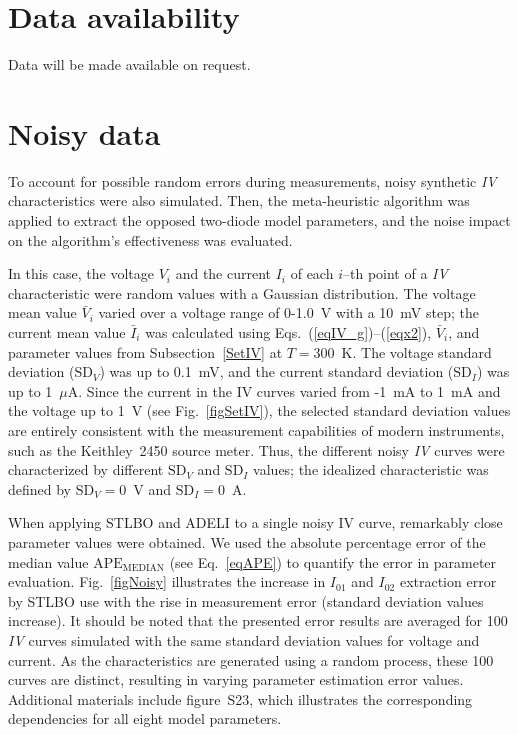 \documentclass[a4paper,fleqn]{cas-sc}
\begin{document}
\section*{Data availability}
Data will be made available on request.


\appendix

\section{Noisy data}\label{Noisy}

To account for possible random errors during measurements,
noisy synthetic \emph{IV} characteristics were also simulated.
Then, the meta-heuristic algorithm was applied to extract the opposed two-diode model parameters,
and the noise impact on the algorithm's effectiveness was evaluated.

In this case, the voltage $V_i$ and the
current $I_i$ of each $i$--th point of a \emph{IV} characteristic were random values with a Gaussian distribution.
The voltage mean value $\bar{V}_i$ varied over a voltage range of 0-1.0~V with a 10~mV step;
the current mean value $\bar{I}_i$ was calculated using Eqs.~(\ref{eqIV_g})--(\ref{eqx2}), $\bar{V}_i$,
and parameter values from Subsection~\ref{SetIV} at $T = 300$~K.
The voltage standard deviation ($\mathrm{SD}_V$) was up to 0.1~mV,
and the current standard deviation ($\mathrm{SD}_I$) was up to 1~$\mu$A.
Since the current in the IV curves varied from -1~mA to 1~mA
and the voltage up to 1~V (see Fig.~\ref{figSetIV}), the selected standard deviation values are entirely consistent
with the measurement capabilities of modern instruments, such as the Keithley~2450 source meter.
Thus, the different noisy \emph{IV} curves were characterized by different $\mathrm{SD}_V$ and $\mathrm{SD}_I$ values;
the idealized characteristic was defined by $\mathrm{SD}_V=0$~V and $\mathrm{SD}_I=0$~A.

When applying STLBO and ADELI to a single noisy IV curve, remarkably close parameter values were obtained.
We used the absolute percentage error of the median value $\mathrm{APE}_\mathrm{MEDIAN}$
(see Eq.~\ref{eqAPE}) to quantify the error in parameter evaluation.
Fig.~\ref{figNoisy} illustrates the increase in $I_{01}$ and $I_{02}$ extraction error by STLBO use
with the rise in measurement error (standard deviation values increase).
It should be noted that the presented error results are averaged for 100 \emph{IV} curves
simulated with the same standard deviation values for voltage and current.
As the characteristics are generated using a random process, these 100 curves are distinct,
resulting in varying parameter estimation error values.
Additional materials include figure~S23, which illustrates the corresponding dependencies
for all eight model parameters.
\end{document}
